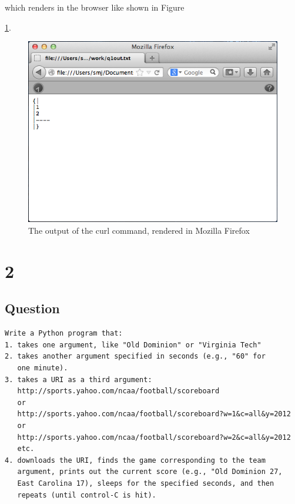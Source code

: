 \documentclass[letterpaper,11pt]{article}
\begin{document}
which renders in the browser like shown in Figure {\ref{fig:q1screenie}.

\begin{figure}
\includegraphics[scale=0.7]{work/q1screenie.png}
\caption{The output of the curl command, rendered in Mozilla Firefox}
\label{fig:q1screenie}
\end{figure}




\newpage
\section*{2}

\subsection*{Question}

\begin{verbatim}
Write a Python program that:
1. takes one argument, like "Old Dominion" or "Virginia Tech"
2. takes another argument specified in seconds (e.g., "60" for 
   one minute).
3. takes a URI as a third argument: 
   http://sports.yahoo.com/ncaa/football/scoreboard
   or
   http://sports.yahoo.com/ncaa/football/scoreboard?w=1&c=all&y=2012
   or
   http://sports.yahoo.com/ncaa/football/scoreboard?w=2&c=all&y=2012
   etc.
4. downloads the URI, finds the game corresponding to the team
   argument, prints out the current score (e.g., "Old Dominion 27, 
   East Carolina 17), sleeps for the specified seconds, and then
   repeats (until control-C is hit).
\end{verbatim}

}
\end{document}
